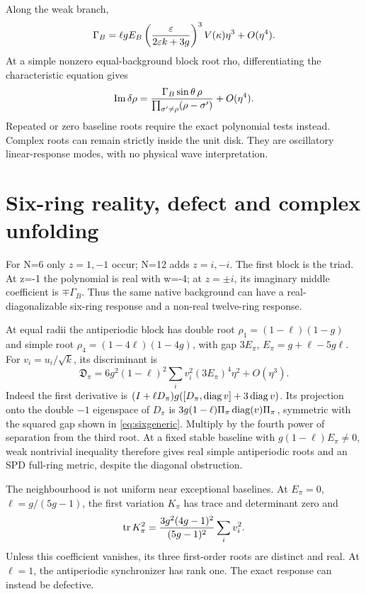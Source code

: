 Along the weak branch,
\[
\Gamma_B=\ell gE_B\left(\frac{\varepsilon}{2\varepsilon k+3g}\right)^3V(\kappa)\eta^3+O(\eta^4).
\]
At a simple nonzero equal-background block root rho, differentiating the characteristic equation gives
\[
\operatorname{Im}\delta\rho=\frac{\Gamma_B\sin\theta\,\rho}
{\prod_{\sigma'\ne\rho}(\rho-\sigma')}+O(\eta^4).
\]
Repeated or zero baseline roots require the exact polynomial tests instead. Complex roots can remain strictly inside the unit disk. They are oscillatory linear-response modes, with no physical wave interpretation. 

\section{Six-ring reality, defect and complex unfolding}\label{sec:six}
For N=6 only \(z=1,-1\) occur; N=12 adds \(z=i,-i\). The first block is the triad. At z=-1 the polynomial is real with w=-4; at \(z=\pm i\), its imaginary middle coefficient is \(\mp\Gamma_B\). Thus the same native background can have a real-diagonalizable six-ring response and a non-real twelve-ring response.

At equal radii the antiperiodic block has double root
\(\rho_1=(1-\ell)(1-g)\) and simple root
\(\rho_4=(1-4\ell)(1-4g)\), with gap \(3E_\pi\), \(E_\pi=g+\ell-5g\ell\).
For \(v_i=u_i/\sqrt{k}\), its discriminant is
\begin{equation}
\mathfrak D_\pi=
6g^2(1-\ell)^2\sum_i v_i^2(3E_\pi)^4\eta^2+O(\eta^3).\label{eq:sixgeneric}
\end{equation}
Indeed the first derivative is
\((I+\ell D_\pi)g([D_\pi,\operatorname{diag} v]+3\operatorname{diag} v)\).
Its projection onto the double \(-1\) eigenspace of \(D_\pi\) is
\(3g(1-\ell)\Pi_\pi\operatorname{diag}(v)\Pi_\pi\), symmetric with the squared gap shown in \eqref{eq:sixgeneric}. Multiply by the fourth power of separation from the third root. At a fixed stable baseline with \(g(1-\ell)E_\pi\ne0\), weak nontrivial inequality therefore gives real simple antiperiodic roots and an SPD full-ring metric, despite the diagonal obstruction.

The neighbourhood is not uniform near exceptional baselines. At \(E_\pi=0\), \(\ell=g/(5g-1)\), the first variation \(K_\pi\) has trace and determinant zero and
\[
\operatorname{tr} K_\pi^2=\frac{3g^2(4g-1)^2}{(5g-1)^2}\sum_i v_i^2.
\]
Unless this coefficient vanishes, its three first-order roots are distinct and real. At \(\ell=1\), the antiperiodic synchronizer has rank one. The exact response can instead be defective.

